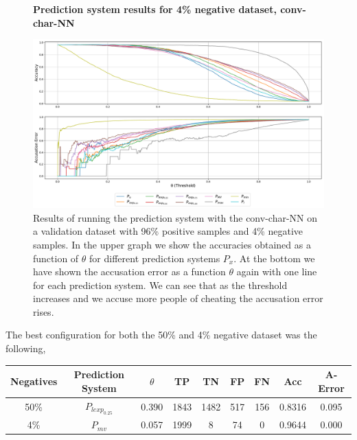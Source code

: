 \begin{figure}
    \centering
    \textbf{Prediction system results for 4\% negative dataset, \gls{conv-char-NN}}\par\medskip
    \includegraphics[scale=0.33]{./pictures/experiments/conv_char_nn/prediction_system_04}
    \caption{Results of running the prediction system with the
    \gls{conv-char-NN} on a validation dataset with 96\% positive samples and
    4\% negative samples. In the upper graph we show the accuracies obtained as
    a function of $\theta$ for different prediction systems $P_x$. At the bottom
    we have shown the accusation error as a function $\theta$ again with one
    line for each prediction system. We can see that as the threshold increases
    and we accuse more people of cheating the accusation error rises.}
    \label{fig:conv-char-NN-pred-4}
\end{figure}

The best configuration for both the 50\% and 4\% negative dataset was the
following,

\begin{adjustbox}{center}
    \begin{tabular}{|c|c|c|c|c|c|c|c|c|}
        \hline
        Negatives  & Prediction System & $\theta$ & TP   & TN   & FP  & FN  &
        Acc        & A-Error
        \\ \hline
        50\%       & $P_{lexp_{0.25}}$ & 0.390    & 1843 & 1482 & 517 & 156 &
        0.8316     & 0.095
        \\ \hline
        4\%        & $P_{mv}$          & 0.057    & 1999 & 8    & 74  & 0   &
        0.9644     & 0.000
        \\ \hline
    \end{tabular}
\end{adjustbox}



